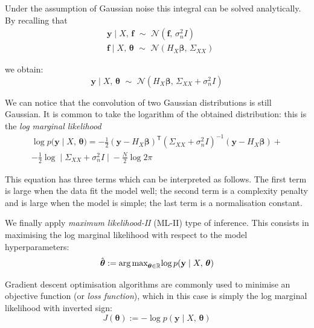 \noindent
Under the assumption of Gaussian noise this integral can be solved analytically. By recalling that
\begin{align}
    &\mathbf{y}\;\vert\; X,\,\mathbf{f}\,\,\sim\,\,\mathcal{N}(\mathbf{f},\,\sigma_n^2I) \\
    &\mathbf{f}\;\vert\; X,\,\boldsymbol{\theta} \,\,\sim\,\,\mathcal{N}(H_{X}\boldsymbol{\beta},\,\Sigma_{XX})
\end{align}

\noindent
we obtain:
\begin{equation}
    \mathbf{y}\;\vert\; X,\,\boldsymbol{\theta}\,\,\sim\,\,\mathcal{N}(H_{X}\boldsymbol{\beta},\,\Sigma_{XX}+\sigma_n^2I)
\end{equation}

\noindent
We can notice that the convolution of two Gaussian distributions is still Gaussian. It is common to take the logarithm of the obtained distribution: this is the \textit{log marginal likelihood}
\begin{equation}\label{eq:logmarginallikelihood}
\begin{split}
    \log{p(\mathbf{y}\;\vert\; X,\,\boldsymbol{\theta}}) = -\frac{1}{2}(\mathbf{y}-H_X\boldsymbol{\beta})^\mathsf{T}(\Sigma_{XX}+\sigma_n^2I)^{-1}(\mathbf{y}-H_X\boldsymbol{\beta}) + \\ -\frac{1}{2}\log{\;\vert\; \Sigma_{XX}+\sigma_n^2I\;\vert\; } - \frac{N}{2}\log{2\pi}
\end{split}
\end{equation}

\noindent
This equation has three terms which can be interpreted as follows. The first term is large when the data fit the model well; the second term is a complexity penalty and is large when the model is simple; the last term is a normalisation constant.

\vspace{0.2cm}
We finally apply \textit{maximum likelihood-II} (ML-II) type of inference. This consists in maximising the log marginal likelihood with respect to the model hyperparameters:
%
\begin{equation}
    \hat{\boldsymbol{\theta}} := \textrm{arg\,max}_{\boldsymbol{\theta}\in\mathbb{R}}{\log{p(\mathbf{y}\;\vert\; X,\,\boldsymbol{\theta})}}
\end{equation}

\noindent
Gradient descent optimisation algorithms are commonly used  to minimise an objective function (or \textit{loss function}), which in this case is simply the log marginal likelihood with inverted sign:
%
\begin{equation}
    J(\boldsymbol{\theta}) := -\log{p(\mathbf{y}\;\vert\; X,\,\boldsymbol{\theta})}
\end{equation}

